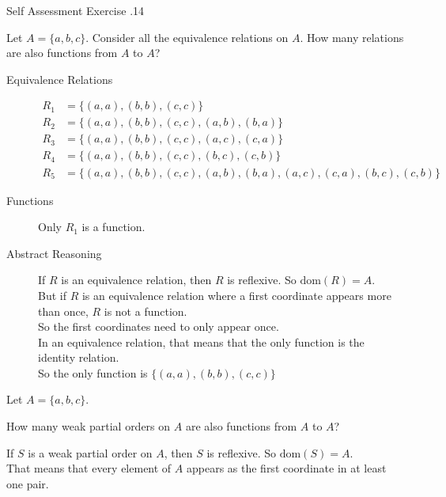 \documentclass[\main/notes.tex]{subfiles}
\begin{document}
\begin{exercise}{Self Assessment Exercise \thechapter.14}
\begin{questions}
\begin{answer}
							\end{answer}
						\pagebreak
						\item Let $A = \{a, b, c\}$. Consider all the equivalence relations on $A$. How many relations are also functions from $A$ to $A$?
							\begin{answer}
								\begin{description}
									\item[Equivalence Relations]
										\begin{align*}
											R_{1} &= \bigl\{(a, a), (b, b), (c, c)\bigr\}\\
											R_{2} &= \bigl\{(a, a), (b, b), (c, c), (a, b), (b, a)\bigr\}\\
											R_{3} &= \bigl\{(a, a), (b, b), (c, c), (a, c), (c, a)\bigr\}\\
											R_{4} &= \bigl\{(a, a), (b, b), (c, c), (b, c), (c, b)\bigr\}\\
											R_{5} &= \bigl\{(a, a), (b, b), (c, c), (a, b), (b, a), (a, c), (c, a), (b, c), (c, b)\bigr\}
										\end{align*}
									\item[Functions] Only $R_{1}$ is a function.
									\item[Abstract Reasoning] If $R$ is an equivalence relation, then $R$ is reflexive. So $\mathrm{dom}(R) = A$.\\
										But if $R$ is an equivalence relation where a first coordinate appears more than once, $R$ is not a function.\\
										So the first coordinates need to only appear once.\\
										In an equivalence relation, that means that the only function is the identity relation.\\
										So the only function is $\bigl\{(a, a), (b, b), (c, c)\bigr\}$
								\end{description}
							\end{answer}
						\item Let $A = \{a, b, c\}$.
							\begin{questions}
								\item How many weak partial orders on $A$ are also functions from $A$ to $A$?\\
									\begin{answer}
										If $S$ is a weak partial order on $A$, then $S$ is reflexive. So $\mathrm{dom}(S) = A$.\\
										That means that every element of $A$ appears as the first coordinate in at least one pair.\\

\end{answer}
\end{questions}
\end{questions}
\end{exercise}
\end{document}

